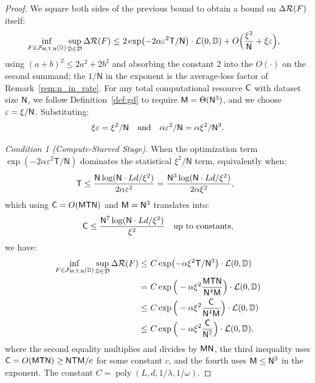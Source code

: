 \documentclass[11pt]{article}
\theoremstyle{plain}
\DeclareMathOperator{\poly}{poly}
\begin{document}
\begin{proof}
    We square both sides of the previous bound to obtain a bound on $\Delta{\cal R}(F)$ itself:
    \begin{align}\label{eq:dr_bound}
        \inf_{F \in {\cal F}_{\sf M, T, N}(\mathbb{D})} \sup_{\mathbb{D} \in {\cal D}}  \Delta{\cal R}(F)
        \leq & ~  2\exp\!\left(-2\alpha \varepsilon^2 \mathsf{T}/\mathsf{N}\right) \cdot {\cal L}(0, \mathbb{D}) + O\Big(\frac{\xi^2}{{\sf N}} + \xi\varepsilon\Big),
    \end{align}
    using $(a+b)^2 \le 2a^2 + 2b^2$ and absorbing the constant $2$ into the $O(\cdot)$ on the second summand; the $1/\mathsf{N}$ in the exponent is the average-loss factor of Remark~\ref{rem:n_in_rate}. For any total computational resource ${\sf C}$ with dataset size ${\sf N}$, we follow Definition~\ref{def:gd} to require ${\sf M} = \Theta({\sf N}^3)$, and we choose $\varepsilon = \xi/{\sf N}$. Substituting:
    \begin{align*}
        \xi\varepsilon = \xi^2/{\sf N} \quad \text{and} \quad \alpha \varepsilon^2/\mathsf{N} = \alpha \xi^2/{\sf N}^3.
    \end{align*}

    {\it Condition 1 (Compute-Starved Stage).} When the optimization term $\exp(-2\alpha\varepsilon^2 \mathsf{T}/\mathsf{N})$ dominates the statistical $\xi^2/\mathsf{N}$ term, equivalently when:
    \begin{align*}
        & ~ {\sf T} \le \frac{\mathsf{N}\log({\sf N}\cdot Ld /\xi^2)}{2\alpha\varepsilon^2}
        = \frac{{\sf N}^3 \log({\sf N}\cdot Ld /\xi^2)}{2\alpha \xi^2},
    \end{align*}
    which using ${\sf C} = O({\sf MTN})$ and ${\sf M} = {\sf N}^3$ translates into:
    \begin{align*}
        {\sf C} \leq \frac{{\sf N}^7\log( {\sf N}  \cdot Ld/\xi^2)}{\xi^2}\quad \text{up to constants},
    \end{align*}
    we have:
    \begin{align*}
        \inf_{F \in {\cal F}_{\sf M, T, N}(\mathbb{D})} \sup_{\mathbb{D} \in {\cal D}}  \Delta{\cal R}(F) \leq & ~ C \exp\!\left(-\alpha \xi^2{\sf T}/{\sf N}^3\right) \cdot {\cal L}(0, \mathbb{D}) \\
        = & ~  C \exp\Big(-\alpha \xi^2 \frac{{\sf MTN}}{{\sf N}^4{\sf M}}\Big) \cdot {\cal L}(0, \mathbb{D}) \\
        \leq & ~  C \exp\Big(-\alpha \xi^2 \frac{{\sf C}}{{\sf N}^4{\sf M}}\Big) \cdot {\cal L}(0, \mathbb{D}) \\
        \leq & ~ C \exp\Big(-\alpha \xi^2 \frac{{\sf C}}{{\sf N}^7}\Big) \cdot {\cal L}(0, \mathbb{D}),
    \end{align*}
    where the second equality multiplies and divides by ${\sf MN}$, the third inequality uses ${\sf C} = O({\sf MTN}) \geq {\sf NTM}/c$ for some constant $c$, and the fourth uses ${\sf M} \le {\sf N}^3$ in the exponent. The constant $C = \poly(L, d, 1/\lambda, 1/\omega)$.



\end{proof}
\end{document}
